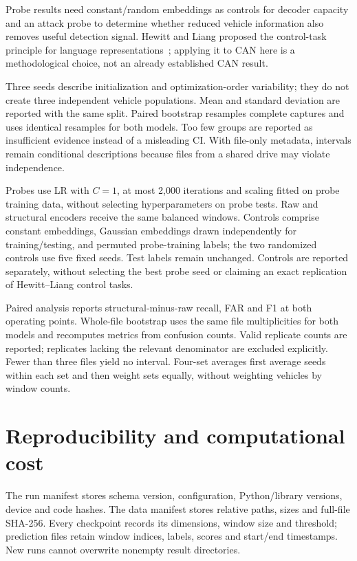 \documentclass[12pt,a4paper,oneside,openany]{extbook}
\begin{document}
Probe results need constant/random embeddings as controls for decoder capacity and an attack probe to determine whether reduced vehicle information also removes useful detection signal. Hewitt and Liang proposed the control-task principle for language representations~\cite{hewitt2019probes}; applying it to CAN here is a methodological choice, not an already established CAN result.

Three seeds describe initialization and optimization-order variability; they do not create three independent vehicle populations. Mean and standard deviation are reported with the same split. Paired bootstrap resamples complete captures and uses identical resamples for both models. Too few groups are reported as insufficient evidence instead of a misleading CI. With file-only metadata, intervals remain conditional descriptions because files from a shared drive may violate independence.

Probes use LR with $C=1$, at most 2,000 iterations and scaling fitted on probe training data, without selecting hyperparameters on probe tests. Raw and structural encoders receive the same balanced windows. Controls comprise constant embeddings, Gaussian embeddings drawn independently for training/testing, and permuted probe-training labels; the two randomized controls use five fixed seeds. Test labels remain unchanged. Controls are reported separately, without selecting the best probe seed or claiming an exact replication of Hewitt--Liang control tasks.

Paired analysis reports structural-minus-raw recall, FAR and F1 at both operating points. Whole-file bootstrap uses the same file multiplicities for both models and recomputes metrics from confusion counts. Valid replicate counts are reported; replicates lacking the relevant denominator are excluded explicitly. Fewer than three files yield no interval. Four-set averages first average seeds within each set and then weight sets equally, without weighting vehicles by window counts.

\section{Reproducibility and computational cost}
The run manifest stores schema version, configuration, Python/library versions, device and code hashes. The data manifest stores relative paths, sizes and full-file SHA-256. Every checkpoint records its dimensions, window size and threshold; prediction files retain window indices, labels, scores and start/end timestamps. New runs cannot overwrite nonempty result directories.
\end{document}
